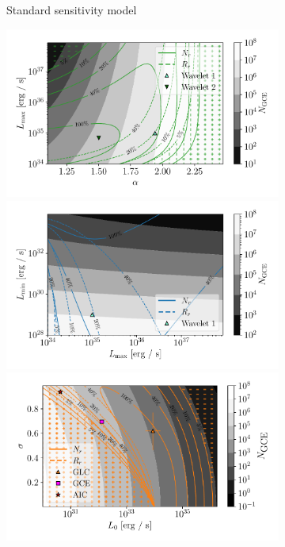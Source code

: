 \documentclass[letter,11pt]{article}
\begin{document}
\begin{figure}
\begin{subfigure}[b]{0.49\textwidth}
        \caption{Standard sensitivity model}
        \label{fig:position-dependent}
    \end{subfigure}
    \hfill
    \begin{subfigure}[b]{0.49\textwidth}
            \includegraphics[width=\textwidth]{figs/power-law-alpha-step.pdf}
        \includegraphics[width=\textwidth]{figs/power-law-step.pdf}
        \includegraphics[width=\textwidth]{figs/log-normal-step.pdf}

\end{subfigure}
\end{figure}
\end{document}
